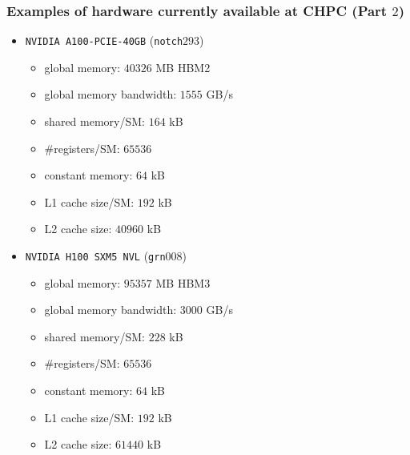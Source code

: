 \begin{frame}
	\frametitle{Examples of hardware currently available at CHPC (Part $2$)}
   \begin{itemize}
	   \item \texttt{NVIDIA A100-PCIE-40GB} (\texttt{notch}$293$)  %
         \begin{itemize}
            \item global memory: $40326$ MB HBM2
            \item global memory bandwidth: $1555$ GB/s
            \item shared memory/SM: $164$ kB
            \item \#registers/SM: $65536$
            \item constant memory: $64$ kB		    
            \item L1 cache size/SM: $192$ kB 		    
            \item L2 cache size: $40960$ kB
         \end{itemize}		   

 \item \texttt{NVIDIA H100 SXM5 NVL} (\texttt{grn}$008$) 
        \begin{itemize}
            \item global memory: $95357$ MB HBM3
            \item global memory bandwidth: $3000$ GB/s
            \item shared memory/SM: $228$ kB
            \item \#registers/SM: $65536$
            \item constant memory: $64$ kB
            \item L1 cache size/SM: $192$ kB		    
            \item L2 cache size: $61440$ kB
         \end{itemize}
   \end{itemize}
\end{frame} 

